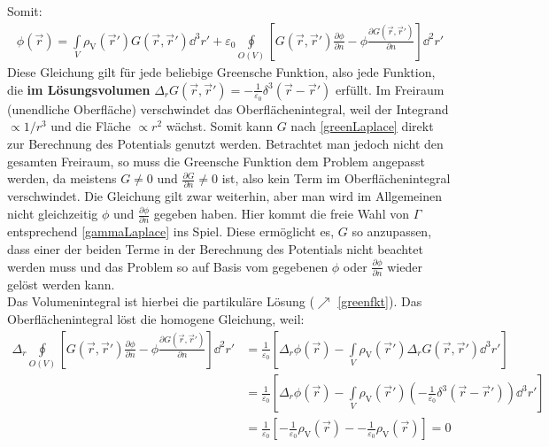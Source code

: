 			   Somit:
			        \begin{equation}\label{GreenPot}\begin{split}
					        \boxed{ \phi(\vec{r} ) = \int\limits_V
						        \rho_\text{V}(\vec{r}' ) G(\vec{r} ,\vec{r}' ) \dd^3 r' + \varepsilon_0 \oint\limits_{O(V)} \left[ G(\vec{r} ,\vec{r}' ) \frac{\partial\phi}{\partial n} - \phi\frac{\partial G(\vec{r} ,\vec{r}' )}{\partial n}\right] \dd^2r'}
				        \end{split}\end{equation}
			   Diese Gleichung gilt für jede beliebige Greensche Funktion, also jede Funktion, die \textbf{im Lösungsvolumen} $\Delta _r G(\vec{r} ,\vec{r}' ) = -\frac{1}{\varepsilon_0} \delta^3(\vec{r} -\vec{r}' )$ erfüllt. Im Freiraum (unendliche Oberfläche) verschwindet das Oberflächenintegral, weil der Integrand $\propto 1/r^3$ und die Fläche $\propto r^2$ wächst. Somit kann $G$ nach \ref{greenLaplace} direkt zur Berechnung des Potentials genutzt werden. Betrachtet man jedoch nicht den gesamten Freiraum, so muss die Greensche Funktion dem Problem angepasst werden, da meistens $G\neq 0$ und $\frac{\partial G}{\partial n}\neq 0$ ist, also kein Term im Oberflächenintegral verschwindet. Die Gleichung gilt zwar weiterhin, aber man wird im Allgemeinen nicht gleichzeitig $\phi$ und $\frac{\partial \phi}{\partial n}$ gegeben haben. Hier kommt die freie Wahl von $\Gamma$ entsprechend \ref{gammaLaplace} ins Spiel. Diese ermöglicht es, $G$ so anzupassen, dass einer der beiden Terme in der Berechnung des Potentials nicht beachtet werden muss und das Problem so auf Basis vom gegebenen $\phi$ oder $\frac{\partial \phi}{\partial n}$ wieder gelöst werden kann.\\
			   Das Volumenintegral ist hierbei die partikuläre Lösung ($\nearrow$ \ref{greenfkt}). Das Oberflächenintegral löst die homogene Gleichung, weil:
			   \begin{align*}
			   	\Delta_r\oint\limits_{O(V)} \left[ G(\vec{r} ,\vec{r}' ) \frac{\partial\phi}{\partial n} - \phi\frac{\partial G(\vec{r} ,\vec{r}' )}{\partial n}\right] \dd^2r' &=\frac{1}{\varepsilon_{0}}\left[\Delta_r\phi(\vec{r} )-\int\limits_V \rho_\text{V}(\vec{r}' ) \Delta_r G(\vec{r} ,\vec{r}' ) \dd^3 r'\right]\\
			   	&=\frac{1}{\varepsilon_{0}}\left[\Delta_r\phi(\vec{r} )-\int\limits_V	\rho_\text{V}(\vec{r}' ) \left(-\frac{1}{\varepsilon_0} \delta^3(\vec{r} -\vec{r}' )\right) \dd^3 r'\right]\\
			   	&=\frac{1}{\varepsilon_{0}}\left[-\frac{1}{\varepsilon_0} \rho_\text{V}(\vec{r} )--\frac{1}{\varepsilon_0}\rho_\text{V}(\vec{r} )\right]=0
			   \end{align*}
